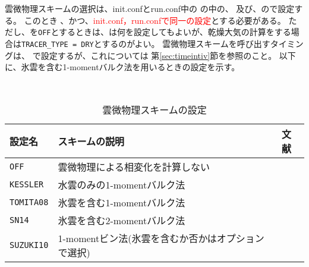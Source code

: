 \section{\SecBasicPhysicsSetting} \label{sec:basic_usel_physics}

\subsection{\SubsecMicrophysicsSetting} \label{subsec:basic_usel_microphys}
雲微物理スキームの選択は、init.confとrun.conf中の
の中の、
及び、ので設定する。
このとき{}
、かつ、\textcolor{red}{init.conf，run.confで同一の設定}とする必要がある。
ただし、を\verb|OFF|とするときは、は何を設定してもよいが、乾燥大気の計算をする場合は\verb|TRACER_TYPE = DRY|とするのがよい。
雲微物理スキームを呼び出すタイミングは、
で設定するが、これについては
第\ref{sec:timeintiv}節を参照のこと。
以下に、氷雲を含む1-momentバルク法を用いるときの設定を示す。


\\

\begin{table}[h]
\begin{center}
  \caption{雲微物理スキームの設定}
  \label{tab:nml_atm_mp}
  \begin{tabularx}{150mm}{lXX} \hline
    \rowcolor[gray]{0.9}  設定名 & スキームの説明 & 文献\\ \hline
     \verb|OFF|      & 雲微物理による相変化を計算しない &  \\
     \verb|KESSLER|  & 水雲のみの1-momentバルク法 & \citet{kessler_1969} \\
     \verb|TOMITA08| & 氷雲を含む1-momentバルク法 & \citet{tomita_2008} \\
     \verb|SN14|     & 氷雲を含む2-momentバルク法 & \citet{sn_2014} \\
     \verb|SUZUKI10| & 1-momentビン法(氷雲を含むか否かはオプションで選択) & \citet{suzuki_etal_2010} \\
    \hline
  \end{tabularx}
\end{center}
\end{table}

